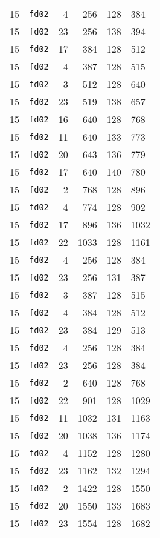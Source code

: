 \documentclass{article}
\begin{document}
\begin{table}[h!]
\begin{tabular}{llrrrl}
    15 & \texttt{fd02} & 4 & 256 & 128 & 384 \\
    15 & \texttt{fd02} & 23 & 256 & 138 & 394 \\
    15 & \texttt{fd02} & 17 & 384 & 128 & 512 \\
    15 & \texttt{fd02} & 4 & 387 & 128 & 515 \\
    15 & \texttt{fd02} & 3 & 512 & 128 & 640 \\
    15 & \texttt{fd02} & 23 & 519 & 138 & 657 \\
    15 & \texttt{fd02} & 16 & 640 & 128 & 768 \\
    15 & \texttt{fd02} & 11 & 640 & 133 & 773 \\
    15 & \texttt{fd02} & 20 & 643 & 136 & 779 \\
    15 & \texttt{fd02} & 17 & 640 & 140 & 780 \\
    15 & \texttt{fd02} & 2 & 768 & 128 & 896 \\
    15 & \texttt{fd02} & 4 & 774 & 128 & 902 \\
    15 & \texttt{fd02} & 17 & 896 & 136 & 1032 \\
    15 & \texttt{fd02} & 22 & 1033 & 128 & 1161 \\
    15 & \texttt{fd02} & 4 & 256 & 128 & 384 \\
    15 & \texttt{fd02} & 23 & 256 & 131 & 387 \\
    15 & \texttt{fd02} & 3 & 387 & 128 & 515 \\
    15 & \texttt{fd02} & 4 & 384 & 128 & 512 \\
    15 & \texttt{fd02} & 23 & 384 & 129 & 513 \\
    15 & \texttt{fd02} & 4 & 256 & 128 & 384 \\
    15 & \texttt{fd02} & 23 & 256 & 128 & 384 \\
    15 & \texttt{fd02} & 2 & 640 & 128 & 768 \\
    15 & \texttt{fd02} & 22 & 901 & 128 & 1029 \\
    15 & \texttt{fd02} & 11 & 1032 & 131 & 1163 \\
    15 & \texttt{fd02} & 20 & 1038 & 136 & 1174 \\
    15 & \texttt{fd02} & 4 & 1152 & 128 & 1280 \\
    15 & \texttt{fd02} & 23 & 1162 & 132 & 1294 \\
    15 & \texttt{fd02} & 2 & 1422 & 128 & 1550 \\
    15 & \texttt{fd02} & 20 & 1550 & 133 & 1683 \\
    15 & \texttt{fd02} & 23 & 1554 & 128 & 1682 \\

\end{tabular}
\end{table}
\end{document}
